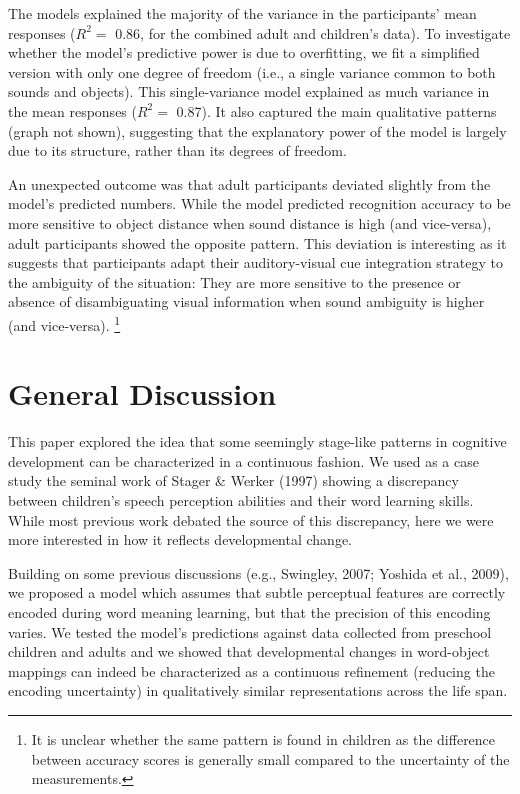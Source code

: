 \documentclass[10pt, letterpaper]{article}
\begin{document}
The models explained the majority of the variance in the participants'
mean responses (\(R^2=\) 0.86, for the combined adult and children's
data). To investigate whether the model's predictive power is due to
overfitting, we fit a simplified version with only one degree of freedom
(i.e., a single variance common to both sounds and objects). This
single-variance model explained as much variance in the mean responses
(\(R^2=\) 0.87). It also captured the main qualitative patterns (graph
not shown), suggesting that the explanatory power of the model is
largely due to its structure, rather than its degrees of freedom.

An unexpected outcome was that adult participants deviated slightly from
the model's predicted numbers. While the model predicted recognition
accuracy to be more sensitive to object distance when sound distance is
high (and vice-versa), adult participants showed the opposite pattern.
This deviation is interesting as it suggests that participants adapt
their auditory-visual cue integration strategy to the ambiguity of the
situation: They are more sensitive to the presence or absence of
disambiguating visual information when sound ambiguity is higher (and
vice-versa).
\footnote{It is unclear whether the same pattern is found in children as the difference between accuracy scores is generally small compared to the uncertainty of the measurements.}

\section{General Discussion}\label{general-discussion}

This paper explored the idea that some seemingly stage-like patterns in
cognitive development can be characterized in a continuous fashion. We
used as a case study the seminal work of Stager \& Werker (1997) showing
a discrepancy between children's speech perception abilities and their
word learning skills. While most previous work debated the source of
this discrepancy, here we were more interested in how it reflects
developmental change.

Building on some previous discussions (e.g., Swingley, 2007; Yoshida et
al., 2009), we proposed a model which assumes that subtle perceptual
features are correctly encoded during word meaning learning, but that
the precision of this encoding varies. We tested the model's predictions
against data collected from preschool children and adults and we showed
that developmental changes in word-object mappings can indeed be
characterized as a continuous refinement (reducing the encoding
uncertainty) in qualitatively similar representations across the life
span.
\end{document}
